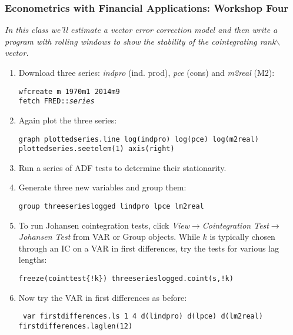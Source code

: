 \documentclass[a4paper,11pt]{article}
\begin{document}
\small
\subsubsection*{Econometrics with Financial Applications: Workshop Four}
\textit{In this class we'll estimate a vector error correction model and then write a program with rolling windows to show the stability of the cointegrating rank$\backslash$vector.}
\begin{enumerate}
\item Download three series: \emph{indpro} (ind. prod), \emph{pce} (cons) and \emph{m2real} (M2):
\begin{center}
\texttt{wfcreate m 1970m1 2014m9\\
fetch FRED::\emph{series}}
\end{center}
\item Again plot the three series:
\begin{center}
\texttt{graph plottedseries.line log(indpro) log(pce) log(m2real) \\
plottedseries.seetelem(1) axis(right)}

\end{center}
\item Run a series of ADF tests to determine their stationarity. 
\item Generate three new variables and group them:
\begin{center}
\texttt{group threeserieslogged lindpro lpce lm2real}
\end{center}
\item To run Johansen cointegration tests, click \emph{View}$\rightarrow$\emph{Cointegration Test}$\rightarrow$\emph{Johansen Test} from VAR or Group objects. While $k$ is typically chosen through an IC on a VAR in first differences, try the tests for various lag lengths:
\begin{center}
\texttt{freeze(cointtest\{!k\}) threeserieslogged.coint(s,!k)}
\end{center}
\item Now try the VAR in first differences as before:\\
\begin{center}
\texttt{
var firstdifferences.ls 1 4 d(lindpro) d(lpce) d(lm2real)
firstdifferences.laglen(12)
}


\end{center}
\end{enumerate}
\end{document}

